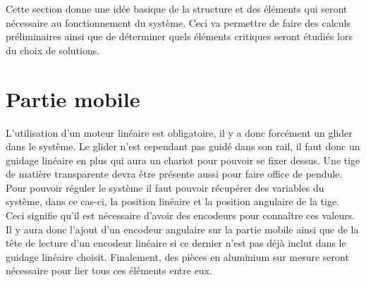 Cette section donne une idée basique de la structure et des éléments qui seront nécessaire au fonctionnement du système.
Ceci va permettre de faire des calculs préliminaires ainsi que de déterminer quels éléments critiques seront étudiés lors du choix
de solutions.

\section{Partie mobile}\label{sec:PartMob}
L'utilisation d'un moteur linéaire est obligatoire, il y a donc forcément un \gls{glider} dans le système. Le \gls{glider} n'est cependant
pas guidé dans son rail, il faut donc un guidage linéaire en plus qui aura un chariot pour pouvoir se fixer dessus. Une tige de matière
transparente devra être présente aussi pour faire office de pendule. Pour pouvoir réguler le système il faut pouvoir récupérer des variables
du système, dans ce cas-ci, la position linéaire et la position angulaire de la tige. Ceci signifie qu'il est nécessaire d'avoir des encodeurs
pour connaître ces valeurs. Il y aura donc l'ajout d'un encodeur angulaire sur la partie mobile ainsi que de la tête de lecture d'un encodeur
linéaire si ce dernier n'est pas déjà inclut dans le guidage linéaire choisit. Finalement, des pièces en aluminium sur mesure seront nécessaire
pour lier tous ces éléments entre eux.
